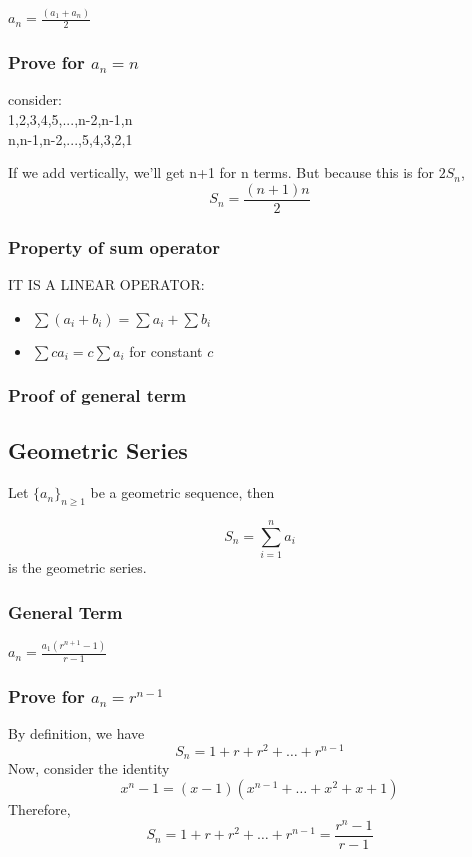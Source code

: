 \documentclass{article}
\begin{document}
$a_n = \frac{(a_1+a_n)}{2}$

\subsubsection{Prove for $a_n=n$}

consider:
\\
1,2,3,4,5,...,n-2,n-1,n\\
n,n-1,n-2,...,5,4,3,2,1

If we add vertically, we'll get n+1 for n terms.
But because this is for $2S_n$, $$S_n=\frac{(n+1)n}{2}$$

\subsubsection{Property of sum operator}

IT IS A LINEAR OPERATOR:

\begin{itemize}
    \item $\sum (a_i+b_i) = \sum a_i + \sum b_i$
    \item $\sum ca_i = c \sum a_i$ for constant $c$
\end{itemize}

\subsubsection{Proof of general term}
\newpage

\subsection{Geometric Series}

Let $\{a_n\}_{n\ge1}$ be a geometric sequence, then 

$$S_n=\sum_{i=1}^{n}a_i$$ 
is the geometric series.

\subsubsection{General Term}

$a_n = \frac{a_1(r^{n+1}-1)}{r-1}$

\subsubsection{Prove for $a_n=r^{n-1}$}
By definition, we have
$$S_n=1+r+r^2+\dots+r^{n-1}$$
Now, consider the identity $$x^n-1=(x-1)(x^{n-1}+\dots+x^2+x+1)$$
Therefore,
$$S_n=1+r+r^2+\dots+r^{n-1}=\frac{r^n-1}{r-1}$$
\end{document}
